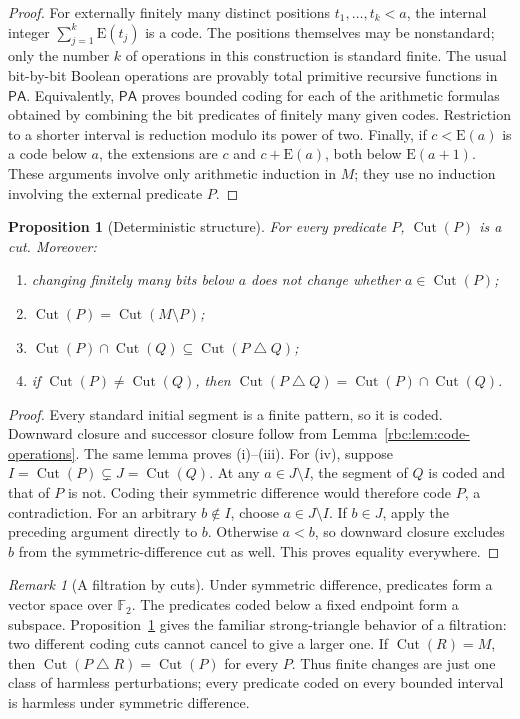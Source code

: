 \documentclass[11pt]{article}
\numberwithin{equation}{section}
\newtheorem{proposition}[theorem]{Proposition}
\theoremstyle{definition}
\theoremstyle{remark}
\newtheorem{remark}[theorem]{Remark}
\newcommand{\PA}{\mathsf{PA}}
\newcommand{\E}{\mathrm E}
\newcommand{\Cut}{\operatorname{Cut}}
\begin{document}
\begin{proof}
For externally finitely many distinct positions $t_1,\ldots,t_k<a$, the
internal integer $\sum_{j=1}^k\E(t_j)$ is a code. The positions themselves
may be nonstandard; only the number $k$ of operations in this construction
is standard finite. The usual bit-by-bit Boolean operations are provably
total primitive recursive functions in $\PA$. Equivalently, $\PA$ proves
bounded coding for each of the arithmetic formulas obtained by combining
the bit predicates of finitely many given codes. Restriction to a shorter
interval is reduction modulo its power of two. Finally, if $c<\E(a)$ is a
code below $a$, the extensions are $c$ and $c+\E(a)$, both below
$\E(a+1)$. These arguments involve only arithmetic induction in $M$;
they use no induction involving the external predicate $P$.
\end{proof}

\begin{proposition}[Deterministic structure]
\label{rbc:prop:cut-structure}
For every predicate $P$, $\Cut(P)$ is a cut. Moreover:
\begin{enumerate}[label=(\roman*)]
\item changing finitely many bits below $a$ does not change whether
$a\in\Cut(P)$;
\item $\Cut(P)=\Cut(M\setminus P)$;
\item $\Cut(P)\cap\Cut(Q)\subseteq\Cut(P\mathbin\triangle Q)$;
\item if $\Cut(P)\ne\Cut(Q)$, then
$\Cut(P\mathbin\triangle Q)=\Cut(P)\cap\Cut(Q)$.
\end{enumerate}
\end{proposition}

\begin{proof}
Every standard initial segment is a finite pattern, so it is coded. Downward
closure and successor closure follow from Lemma~\ref{rbc:lem:code-operations}.
The same lemma proves (i)--(iii). For (iv), suppose
$I=\Cut(P)\subsetneq J=\Cut(Q)$. At any $a\in J\setminus I$, the segment
of $Q$ is coded and that of $P$ is not. Coding their symmetric difference
would therefore code $P$, a contradiction. For an arbitrary $b\notin I$,
choose $a\in J\setminus I$. If $b\in J$, apply the preceding argument
directly to $b$. Otherwise $a<b$, so downward closure excludes $b$ from
the symmetric-difference cut as well. This proves equality everywhere.
\end{proof}

\begin{remark}[A filtration by cuts]
Under symmetric difference, predicates form a vector space over
$\mathbb F_2$. The predicates coded below a fixed endpoint form a subspace.
Proposition~\ref{rbc:prop:cut-structure} gives the familiar strong-triangle
behavior of a filtration: two different coding cuts cannot cancel to give a
larger one. If $\Cut(R)=M$, then
$\Cut(P\mathbin\triangle R)=\Cut(P)$ for every $P$. Thus finite changes
are just one class of harmless perturbations; every predicate coded on
every bounded interval is harmless under symmetric difference.
\end{remark}
\end{document}
